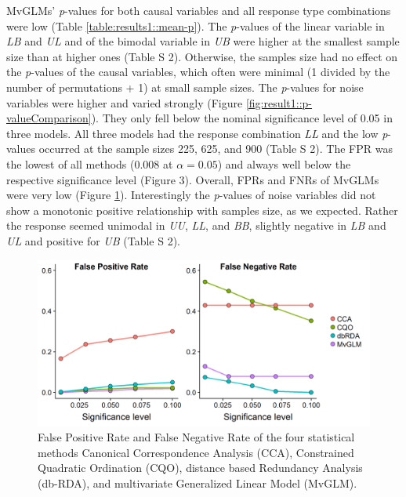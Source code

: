 \documentclass[a4paper,11pt]{article}
\begin{document}
		MvGLMs' \textit{p}-values for both causal variables and all response type combinations were low (Table  \ref{table:results1::mean-p}).
        The \textit{p}-values of the linear variable in \textit{LB} and \textit{UL} and of the bimodal variable in \textit{UB} were higher at the smallest sample size than at higher ones (Table S 2).  
		Otherwise, the samples size had no effect on the \textit{p}-values of the causal variables, which often were minimal (1 divided by the number of permutations + 1) at small sample sizes.
		The \textit{p}-values for noise variables were higher and varied strongly (Figure \ref{fig:result1::p-valueComparison}).
		They only fell below the nominal significance level of 0.05 in three models. 
		All three models had the response combination \textit{LL} and the low \textit{p}-values occurred at the sample sizes 225, 625, and 900 (Table S 2).
		The FPR was the lowest of all methods (0.008 at $\alpha = 0.05$) and always well below the respective significance level (Figure 3). 
		Overall, FPRs and FNRs of MvGLMs were very low (Figure \ref{fig:FPNR}).
        Interestingly the \textit{p}-values of noise variables did not show a monotonic positive relationship with samples size, as we expected. 
        Rather the response seemed unimodal in \textit{UU}, \textit{LL}, and \textit{BB}, slightly negative in \textit{LB} and \textit{UL} and positive for \textit{UB} (Table S 2). \\ 
        
        \begin{figure}[h]
            \centering
            \includegraphics[scale = 0.7]{figures/FPNR.png}
            \caption{False Positive Rate and False Negative Rate of the four statistical methods Canonical Correspondence Analysis (CCA), Constrained Quadratic Ordination (CQO), distance based Redundancy Analysis (db-RDA), and multivariate Generalized Linear Model (MvGLM). }
            \label{fig:FPNR}
        \end{figure}{}
                    
\end{document}
